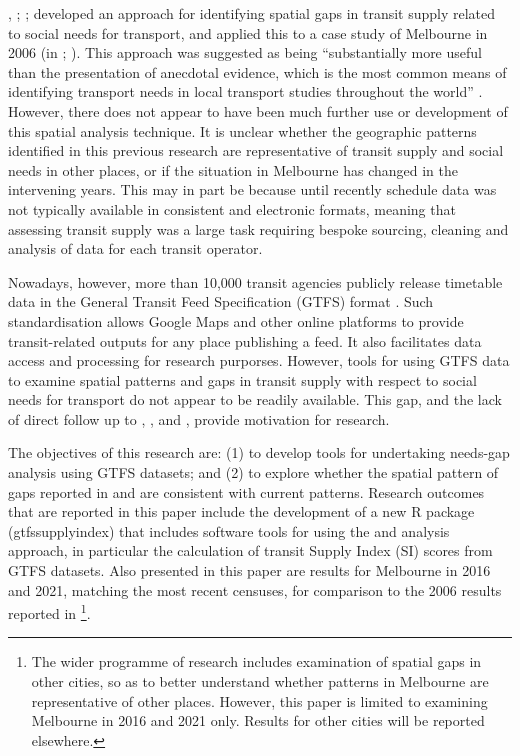 \documentclass[preprint, 3p,
authoryear]{elsarticle} %
\begin{document}
\citet{Currie2003Hobart}, \citet{Currie2004Gap};
\citet{Currie2007Identifying}; \citet{currie2010identifying} developed
an approach for identifying spatial gaps in transit supply related to
social needs for transport, and applied this to a case study of
Melbourne in 2006 (in \citet{Currie2007Identifying};
\citet{currie2010identifying}). This approach was suggested as being
``substantially more useful than the presentation of anecdotal evidence,
which is the most common means of identifying transport needs in local
transport studies throughout the world'' \citep{currie2010identifying}.
However, there does not appear to have been much further use or
development of this spatial analysis technique. It is unclear whether
the geographic patterns identified in this previous research are
representative of transit supply and social needs in other places, or if
the situation in Melbourne has changed in the intervening years. This
may in part be because until recently schedule data was not typically
available in consistent and electronic formats, meaning that assessing
transit supply was a large task requiring bespoke sourcing, cleaning and
analysis of data for each transit operator.

Nowadays, however, more than 10,000 transit agencies publicly release
timetable data in the General Transit Feed Specification (GTFS) format
\citep{GTFS}. Such standardisation allows Google Maps and other online
platforms to provide transit-related outputs for any place publishing a
feed. It also facilitates data access and processing for research
purporses. However, tools for using GTFS data to examine spatial
patterns and gaps in transit supply with respect to social needs for
transport do not appear to be readily available. This gap, and the lack
of direct follow up to \citet{Currie2003Hobart}, \citet{Currie2004Gap},
\citet{Currie2007Identifying} and \citet{currie2010identifying}, provide
motivation for research.

The objectives of this research are: (1) to develop tools for
undertaking needs-gap analysis using GTFS datasets; and (2) to explore
whether the spatial pattern of gaps reported in
\citet{Currie2007Identifying} and \citet{currie2010identifying} are
consistent with current patterns. Research outcomes that are reported in
this paper include the development of a new R package (gtfssupplyindex)
that includes software tools for using the \citet{Currie2007Identifying}
and \citet{currie2010identifying} analysis approach, in particular the
calculation of transit Supply Index (SI) scores from GTFS datasets. Also
presented in this paper are results for Melbourne in 2016 and 2021,
matching the most recent censuses, for comparison to the 2006 results
reported in \citet{currie2010identifying}\footnote{The wider programme
  of research includes examination of spatial gaps in other cities, so
  as to better understand whether patterns in Melbourne are
  representative of other places. However, this paper is limited to
  examining Melbourne in 2016 and 2021 only. Results for other cities
  will be reported elsewhere.}.
\end{document}

